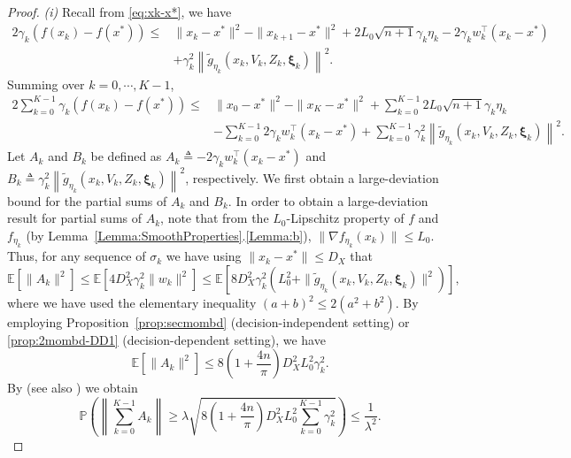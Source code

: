 \documentclass[11pt,reqno]{amsart}
\newcommand{\1}{{\bf 1}}
\newcommand{\2}{{\bf 2}}
\newcommand{\bxi}{\boldsymbol{\xi}}
\newcommand{\E}{\mathbb E}
\newcommand{\lc}{\left[}
\newcommand{\rc}{\right]}
\numberwithin{equation}{section}
\theoremstyle{remark}
\begin{document}
{		\begin{proof}
		\emph{(i)} Recall from \eqref{eq:xk-x*}, we have
		\begin{align}
			2\gamma_k \left(f(x_k)-f(x^*)\right)\leq&   \|x_k-x^*\|^2-\|x_{k+1}-x^*\|^2+2L_0\sqrt{n+1}\gamma_k\eta_k-2\gamma_k w_k^{\top}(x_k-x^*)\nonumber\\
			& + \gamma_k^2\left\| {\tilde{g}_{\eta_k}}(x_k,V_k,Z_k, \bxi_k)\right\|^2.
		\end{align}
		Summing over $k=0,\cdots, {K-1}$,
		\begin{align}\label{eq:fk-f*}
			2\sum_{k=0}^{K-1}\gamma_k \left(f(x_k)-f(x^*)\right) \leq& \|x_0-x^*\|^2-\|x_{K}-x^*\|^2+\sum_{k=0}^{K-1}2L_0\sqrt{n+1}\gamma_k\eta_k\nonumber\\
			&-\sum_{k=0}^{K-1}2\gamma_k w_k^{\top}(x_k-x^*)+\sum_{k=0}^{K-1}\gamma_k^2\left\| {\tilde{g}_{\eta_k}}(x_k,V_k,Z_k, \bxi_k)\right\|^2.
		\end{align}
		Let $A_k$ and $B_k$ be defined as $A_k \triangleq -2\gamma_k w_k^{\top}(x_k-x^*)$ and $B_k \triangleq \gamma_k^2\left\| {\tilde{g}_{\eta_k}}(x_k,V_k,Z_k, \bxi_k)\right\|^2$, respectively. We first obtain {a large-deviation bound} for the partial sums of $A_k$  and $B_k$.  In order to obtain a large-deviation result for partial sums of $A_k$, note that from the $L_0$-Lipschitz property of $f$ and $f_{\eta_k}$ (by Lemma~\ref{Lemma:SmoothProperties}.\ref{Lemma:b}), $\|\nabla f_{\eta_k}(x_k)\| \leq L_0$. Thus, for any sequence of $\sigma_k$ we have using $\|x_k - x^{\ast}\| \leq D_X$ that
		\begin{equation*}
			\E \lc {\|A_k\|^2}  \rc \leq\E \left[ 4D_X^2\gamma_k^2\|w_k\|^2  \right]\leq\E \lc 8D_X^2\gamma_k^2\left(L_0^2+\|\tilde{g}_{\eta_k}(x_k,V_k,Z_k, \bxi_k) \|^2\right)\rc,
		\end{equation*} 
		where we have used the elementary inequality $(a+b)^2 \leq 2(a^2 + b^2)$. By  employing Proposition~\ref{prop:secmombd} ({decision-independent setting}) {or} \ref{prop:2mombd-DD1} ({decision-dependent setting}), we have
		\begin{equation*}
			\E \lc {\|A_k\|^2}  \rc  \leq 8\left(1+\frac{4n}{\pi}\right)D_X^2L_0^2\gamma_k^2.
		\end{equation*}
		By \cite[Lem 2.3]{ghadimi2013stochastic} (see also \cite[Thm 2.1]{juditsky2008large}) we obtain
		\begin{equation}\label{eq:pbAk1}
			\mathbb{P}\left(\left\|\sum_{k=0}^{K-1}A_k\right\|\geq \lambda\sqrt{8\left(1+\frac{4n}{\pi}\right)D_X^2L_0^2\sum_{k=0}^{K-1}\gamma_k^2}\right)\leq \frac{1}{\lambda^2}.

\end{equation}
\end{proof}}
\end{document}
